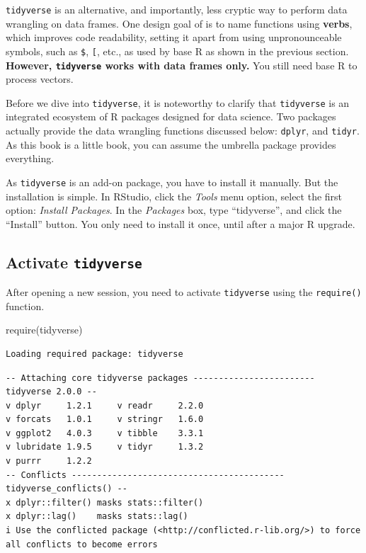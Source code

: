 \documentclass[
  letterpaper,
  DIV=11,
  numbers=noendperiod]{scrreprt}
\newenvironment{Shaded}{\begin{snugshade}}{\end{snugshade}}
\newcommand{\FunctionTok}[1]{\textcolor[rgb]{0.28,0.35,0.67}{#1}}
\newcommand{\NormalTok}[1]{\textcolor[rgb]{0.00,0.23,0.31}{#1}}
\begin{document}
\texttt{tidyverse} is an alternative, and importantly, less cryptic way
to perform data wrangling on data frames. One design goal of is to name
functions using \textbf{verbs}, which improves code readability, setting
it apart from using unpronounceable symbols, such as \texttt{\$},
\texttt{{[}}, etc., as used by base R as shown in the previous section.
\textbf{However, \texttt{tidyverse} works with data frames only.} You
still need base R to process vectors.

Before we dive into \texttt{tidyverse}, it is noteworthy to clarify that
\texttt{tidyverse} is an integrated ecosystem of R packages designed for
data science. Two packages actually provide the data wrangling functions
discussed below: \texttt{dplyr}, and \texttt{tidyr}. As this book is a
little book, you can assume the umbrella package provides everything.

As \texttt{tidyverse} is an add-on package, you have to install it
manually. But the installation is simple. In RStudio, click the
\emph{Tools} menu option, select the first option: \emph{Install
Packages}. In the \emph{Packages} box, type ``tidyverse'', and click the
``Install'' button. You only need to install it once, until after a
major R upgrade.

\subsection{\texorpdfstring{Activate
\texttt{tidyverse}}{Activate tidyverse}}\label{activate-tidyverse}

After opening a new session, you need to activate \texttt{tidyverse}
using the \texttt{require()} function.

\begin{Shaded}
\begin{Highlighting}[]
\FunctionTok{require}\NormalTok{(tidyverse)}
\end{Highlighting}
\end{Shaded}

\begin{verbatim}
Loading required package: tidyverse
\end{verbatim}

\begin{verbatim}
-- Attaching core tidyverse packages ------------------------ tidyverse 2.0.0 --
v dplyr     1.2.1     v readr     2.2.0
v forcats   1.0.1     v stringr   1.6.0
v ggplot2   4.0.3     v tibble    3.3.1
v lubridate 1.9.5     v tidyr     1.3.2
v purrr     1.2.2     
-- Conflicts ------------------------------------------ tidyverse_conflicts() --
x dplyr::filter() masks stats::filter()
x dplyr::lag()    masks stats::lag()
i Use the conflicted package (<http://conflicted.r-lib.org/>) to force all conflicts to become errors
\end{verbatim}
\end{document}
